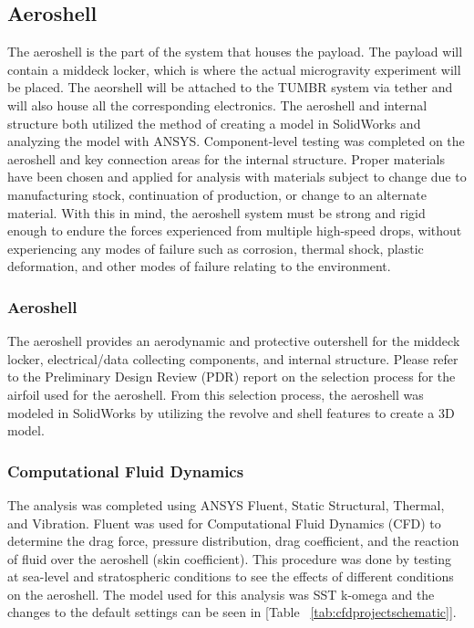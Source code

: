 
\subsection{Aeroshell}

\indent\indent The aeroshell is the part of the system that houses the payload. The payload will contain a middeck locker, which is where the actual microgravity experiment will be placed. The aeorshell will be attached to the TUMBR system via tether and will also house all the corresponding electronics. The aeroshell and internal structure both utilized the method of creating a model in SolidWorks and analyzing the model with ANSYS. Component-level testing was completed on the aeroshell and key connection areas for the internal structure. Proper materials have been chosen and applied for analysis with materials subject to change due to manufacturing stock, continuation of production, or change to an alternate material. With this in mind, the aeroshell system must be strong and rigid enough to endure the forces experienced from multiple high-speed drops, without experiencing any modes of failure such as corrosion, thermal shock, plastic deformation, and other modes of failure relating to the environment.

\subsubsection{Aeroshell}

\indent\indent The aeroshell provides an aerodynamic and protective outershell for the middeck locker, electrical/data collecting components, and internal structure. Please refer to the Preliminary Design Review (PDR) report on the selection process for the airfoil used for the aeroshell. From this selection process, the aeroshell was modeled in SolidWorks by utilizing the revolve and shell features to create a 3D model. 

\subsubsection*{Computational Fluid Dynamics}
\indent\indent The analysis was completed using ANSYS Fluent, Static Structural, Thermal, and Vibration. Fluent was used for Computational Fluid Dynamics (CFD) to determine the drag force, pressure distribution, drag coefficient, and the reaction of fluid over the aeroshell (skin coefficient). This procedure was done by testing at sea-level and stratospheric conditions to see the effects of different conditions on the aeroshell. The model used for this analysis was SST k-omega and the changes to the default settings can be seen in [Table ~\ref{tab:cfdprojectschematic}].

